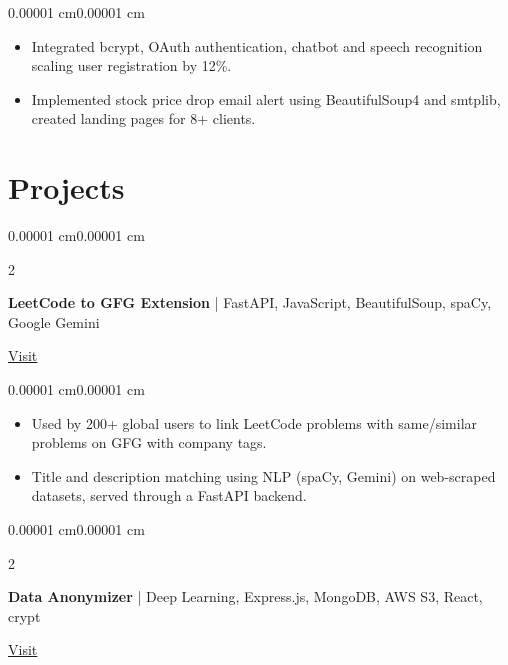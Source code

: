 \documentclass[10pt, letterpaper]{article}
\newenvironment{highlights}{
    \begin{itemize}[
        topsep=0.10 cm,
        parsep=0.10 cm,
        partopsep=0pt,
        itemsep=0pt,
        leftmargin=10pt
    ]
}{
    \end{itemize}
}
\newenvironment{onecolentry}{
    \begin{adjustwidth}{0.00001 cm}{0.00001 cm}
}{
    \end{adjustwidth}
}
\newenvironment{twocolentry}[2][]{
    \onecolentry
    \def\secondColumn{#2}
    \setcolumnwidth{\fill, 4.5 cm}
    \begin{paracol}{2}
}{
    \switchcolumn \raggedleft \secondColumn
    \end{paracol}
    \endonecolentry
}
\begin{document}
\begin{onecolentry}
\begin{highlights}
    \item Integrated bcrypt, OAuth authentication, chatbot and speech recognition scaling user registration by 12\%.
    \item Implemented stock price drop email alert using BeautifulSoup4 and smtplib, created landing pages for 8+ clients.
\end{highlights}
\end{onecolentry}

\vspace{0.2 cm}

\section{Projects}

\begin{twocolentry}{
\href{https://chromewebstore.google.com/detail/leetcode-to-gfg/idlcinljjhfgnfdcoigikeekmnackapg}{\underline{Visit}}
}
\textbf{LeetCode to GFG Extension} | FastAPI, JavaScript, BeautifulSoup, spaCy, Google Gemini
\end{twocolentry}

\vspace{0.10 cm}

\begin{onecolentry}
\begin{highlights}
    \item Used by 200+ global users to link LeetCode problems with same/similar problems on GFG with company tags.
    \item Title and description matching using NLP (spaCy, Gemini) on web-scraped datasets, served through a FastAPI backend.
\end{highlights}
\end{onecolentry}

\vspace{0.2 cm}

\begin{twocolentry}{
\href{https://github.com/vs704vs/data-anonymiser/tree/enc-dec}{\underline{Visit}}
}
\textbf{Data Anonymizer} | Deep Learning, Express.js, MongoDB, AWS S3, React, crypt
\end{twocolentry}

\vspace{0.10 cm}
\end{document}
